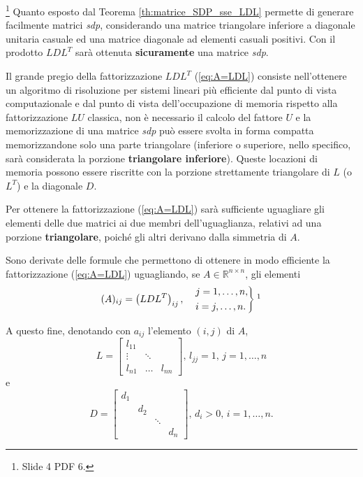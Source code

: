 \begin{remark}\footnote{Slide 4 PDF 6.}
    Quanto esposto dal Teorema \ref{th:matrice_SDP_sse_LDL} permette di generare facilmente matrici \textit{sdp}, considerando una matrice triangolare inferiore a diagonale unitaria casuale ed una matrice diagonale ad elementi casuali positivi.
    Con il prodotto $LDL^T$ sarà ottenuta \textbf{sicuramente} una matrice \textit{sdp}.
\end{remark}

Il grande pregio della fattorizzazione $LDL^T$ (\ref{eq:A=LDL}) consiste nell'ottenere un algoritmo di risoluzione per sistemi lineari più efficiente dal punto di vista computazionale e dal punto di vista dell'occupazione di memoria rispetto alla fattorizzazione $LU$ classica, non è necessario il calcolo del fattore $U$ e la memorizzazione di una matrice \textit{sdp} può essere svolta in forma compatta memorizzandone solo una parte triangolare (inferiore o superiore, nello specifico, sarà considerata la porzione \textbf{triangolare inferiore}). Queste locazioni di memoria possono essere riscritte con la porzione strettamente triangolare di $L$ (o $L^T$) e la diagonale $D$.

Per ottenere la fattorizzazione (\ref{eq:A=LDL}) sarà sufficiente uguagliare gli elementi delle due matrici ai due membri dell'uguaglianza, relativi ad una porzione \textbf{triangolare}, poiché gli altri derivano dalla simmetria di $A$.

Sono derivate delle formule che permettono di ottenere in modo efficiente la fattorizzazione (\ref{eq:A=LDL}) uguagliando, se $A\in \mathbb R^{n\times n}$, gli elementi
\begin{equation*}
    (A)_{ij}=\left(LDL^T\right)_{ij},\quad\begin{rcases}
         j=1,\hdots,n,\\
         i=j,\hdots, n.
    \end{rcases}\footnotemark
\end{equation*}

A questo fine, denotando con $a_{ij}$ l'elemento $(i,j)$ di $A$,
\begin{equation*}
    L = 
    \begin{bmatrix}
        l_{11}\\
        \vdots & \ddots\\
        l_{n1} &\hdots & l_{nn}
    \end{bmatrix},\, 
    l_{jj}=1,\,j=1,\hdots, n
\end{equation*}
e
\begin{equation*}
    D=
    \begin{bmatrix}
        d_1\\
        & d_2\\
        & & \ddots\\
        & & & d_n
    \end{bmatrix},\,
        d_i>0,\,i=1,\hdots, n.
\end{equation*}

